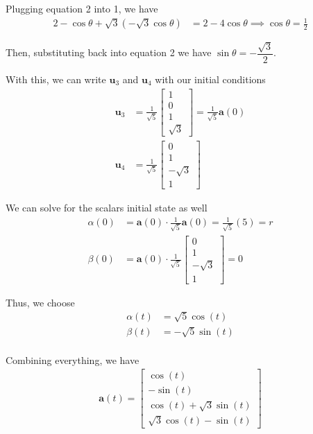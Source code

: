 \documentclass[12pt]{article}
\begin{document}
Plugging equation 2 into 1, we have
\begin{align*}
    2 - \cos\theta + \sqrt{3}(-\sqrt{3}\cos\theta) & = 2-4\cos\theta \implies{} \cos\theta = \frac{1}{2}
\end{align*}

Then, substituting back into equation 2 we have $\sin\theta = -\dfrac{\sqrt{3}}{2}$.

With this, we can write $\mathbf{u}_3$ and $\mathbf{u}_4$ with our initial conditions
\begin{align*}
    \mathbf{u}_3 & = \frac{1}{\sqrt{5}}\begin{bmatrix}1 \\ 0 \\ 1 \\ \sqrt{3} \end{bmatrix} = \frac{1}{\sqrt{5}}\mathbf{a}(0) \\
    \mathbf{u}_4 & = \frac{1}{\sqrt{5}}\begin{bmatrix}0 \\ 1 \\ -\sqrt{3} \\ 1 \end{bmatrix}
\end{align*}

We can solve for the scalars initial state as well
\begin{align*}
    \alpha(0) & = \mathbf{a}(0) \cdot{} \frac{1}{\sqrt{5}}\mathbf{a}(0) = \frac{1}{\sqrt{5}}(5) = r                 \\
    \beta(0)  & = \mathbf{a}(0) \cdot{} \frac{1}{\sqrt{5}}\begin{bmatrix}0 \\ 1 \\ -\sqrt{3} \\ 1 \end{bmatrix} = 0
\end{align*}

Thus, we choose
\begin{align*}
    \alpha(t) & = \sqrt{5}\cos(t)  \\
    \beta(t)  & = -\sqrt{5}\sin(t) \\
\end{align*}

Combining everything, we have
\begin{align*}
    \mathbf{a}(t) = \begin{bmatrix}\cos(t) \\ -\sin(t) \\ \cos(t) + \sqrt{3}\sin(t) \\ \sqrt{3}\cos(t) - \sin(t) \end{bmatrix}
\end{align*}
\end{document}
